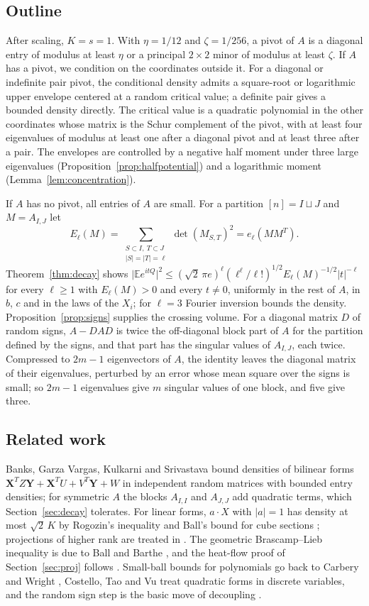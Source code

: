 \documentclass[11pt]{amsart}
\numberwithin{equation}{section}
\theoremstyle{definition}
\theoremstyle{remark}
\newcommand{\E}{\mathbb E}
\newcommand{\1}{\mathbf 1}
\newcommand{\abs}[1]{\lvert #1\rvert}
\begin{document}
\subsection*{Outline}
After scaling, $K=s=1$. With $\eta=1/12$ and $\zeta=1/256$, a pivot of $A$ is a diagonal entry of modulus at least $\eta$ or a principal $2\times2$ minor of modulus at least $\zeta$. If $A$ has a pivot, we condition on the coordinates outside it. For a diagonal or indefinite pair pivot, the conditional density admits a square-root or logarithmic upper envelope centered at a random critical value; a definite pair gives a bounded density directly. The critical value is a quadratic polynomial in the other coordinates whose matrix is the Schur complement of the pivot, with at least four eigenvalues of modulus at least one after a diagonal pivot and at least three after a pair. The envelopes are controlled by a negative half moment under three large eigenvalues (Proposition~\ref{prop:halfpotential}) and a logarithmic moment (Lemma~\ref{lem:concentration}).

If $A$ has no pivot, all entries of $A$ are small. For a partition $[n]=I\sqcup J$ and $M=A_{I,J}$ let
\[
E_\ell(M)=\sum_{\substack{S\subset I,\ T\subset J\\ \abs S=\abs T=\ell}}\det(M_{S,T})^2=e_\ell(MM^T).
\]
Theorem~\ref{thm:decay} shows $\abs{\E e^{itQ}}^2\le(\sqrt2\,\pi e)^\ell(\ell^\ell/\ell!)^{1/2}E_\ell(M)^{-1/2}\abs t^{-\ell}$ for every $\ell\ge1$ with $E_\ell(M)>0$ and every $t\ne0$, uniformly in the rest of $A$, in $b$, $c$ and in the laws of the $X_i$; for $\ell=3$ Fourier inversion bounds the density. Proposition~\ref{prop:signs} supplies the crossing volume. For a diagonal matrix $D$ of random signs, $A-DAD$ is twice the off-diagonal block part of $A$ for the partition defined by the signs, and that part has the singular values of $A_{I,J}$, each twice. Compressed to $2m-1$ eigenvectors of $A$, the identity leaves the diagonal matrix of their eigenvalues, perturbed by an error whose mean square over the signs is small; so $2m-1$ eigenvalues give $m$ singular values of one block, and five give three.

\subsection*{Related work}
Banks, Garza Vargas, Kulkarni and Srivastava \cite[Theorem~2.1]{BGKS} bound densities of bilinear forms $\mathbf X^T Z\mathbf Y+\mathbf X^TU+V^T\mathbf Y+W$ in independent random matrices with bounded entry densities; for symmetric $A$ the blocks $A_{I,I}$ and $A_{J,J}$ add quadratic terms, which Section~\ref{sec:decay} tolerates. For linear forms, $a\cdot X$ with $\abs a=1$ has density at most $\sqrt2\,K$ by Rogozin's inequality \cite{Rogozin} and Ball's bound for cube sections \cite{Ball}; projections of higher rank are treated in \cite{RV,LPP}. The geometric Brascamp--Lieb inequality is due to Ball \cite{Ball} and Barthe \cite{Barthe}, and the heat-flow proof of Section~\ref{sec:proj} follows \cite{CLL,BCCT}. Small-ball bounds for polynomials go back to Carbery and Wright \cite{CW}, Costello, Tao and Vu \cite{CTV} treat quadratic forms in discrete variables, and the random sign step is the basic move of decoupling \cite{DG}.
\end{document}
